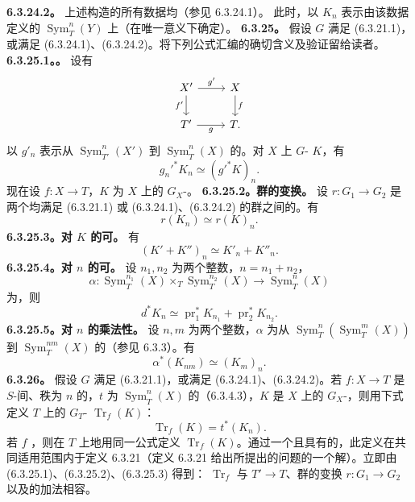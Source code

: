 \textbf{6.3.24.2。} 上述构造的所有数据均（参见 6.3.24.1）。
此时，以 $K_n$ 表示由该数据定义的 $\operatorname{Sym}_T^n(Y)$ 上（在唯一意义下确定）。
\textbf{6.3.25。} 假设 $G$ 满足 (6.3.21.1)，或满足 (6.3.24.1)、(6.3.24.2)。将下列公式汇编的确切含义及验证留给读者。
\textbf{6.3.25.1。。} 设有
\[\begin{tikzcd}X'\arrow[r,"g'"]\arrow[d,"f'"']&X\arrow[d,"f"]\\T'\arrow[r,"g"']&T.\end{tikzcd}\]
以 $g'_n$ 表示从 $\operatorname{Sym}_{T'}^n(X')$ 到 $\operatorname{Sym}_T^n(X)$ 的。对 $X$ 上 $G$- $K$，有
\[g_n'^*K_n\simeq(g'^*K)_n.\]
现在设 $f:X\to T$，$K$ 为 $X$ 上的 $G_X$-。
\textbf{6.3.25.2。群的变换。} 设 $r:G_1\to G_2$ 是两个均满足 (6.3.21.1) 或 (6.3.24.1)、(6.3.24.2) 的群之间的。有
\[r(K_n)\simeq r(K)_n.\]
\textbf{6.3.25.3。对 $K$ 的可。} 有
\[(K'+K'')_n\simeq K'_n+K''_n.\]
\textbf{6.3.25.4。对 $n$ 的可。} 设 $n_1,n_2$ 为两个整数，$n=n_1+n_2$，
\[\alpha:\operatorname{Sym}_T^{n_1}(X)\times_T\operatorname{Sym}_T^{n_2}(X)\longrightarrow\operatorname{Sym}_T^n(X)\]
为，则
\[d^*K_n\simeq\operatorname{pr}_1^*K_{n_1}+\operatorname{pr}_2^*K_{n_2}.\]
\textbf{6.3.25.5。对 $n$ 的乘法性。} 设 $n,m$ 为两个整数，$\alpha$ 为从 $\operatorname{Sym}_T^n(\operatorname{Sym}_T^m(X))$ 到 $\operatorname{Sym}_T^{nm}(X)$ 的（参见 6.3.3）。有
\[\alpha^*(K_{nm})\simeq(K_m)_n.\]
\textbf{6.3.26。} 假设 $G$ 满足 (6.3.21.1)，或满足 (6.3.24.1)、(6.3.24.2)。若 $f:X\to T$ 是 $S$-间、秩为 $n$ 的，$t$ 为 $\operatorname{Sym}_T^n(X)$ 的（6.3.4.3），$K$ 是 $X$ 上的 $G_X$-，则用下式定义 $T$ 上的 $G_T$- $\operatorname{Tr}_f(K)$：
\[\operatorname{Tr}_f(K)=t^*(K_n).\tag{6.3.26.1}\]
若 $f$ ，则在 $T$ 上地用同一公式定义 $\operatorname{Tr}_f(K)$。通过一个且具有的，此定义在共同适用范围内于定义 6.3.21（定义 6.3.21 给出所提出的问题的一个解）。立即由 (6.3.25.1)、(6.3.25.2)、(6.3.25.3) 得到： $\operatorname{Tr}_f$ 与 $T'\to T$、群的变换 $r:G_1\to G_2$ 以及的加法相容。
